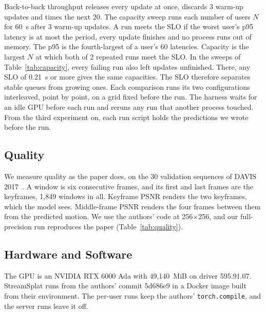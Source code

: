 Back-to-back throughput releases every update at once, discards 3 warm-up updates and times the next 20. %
The capacity sweep runs each number of users $N$ for 60~s after 3 warm-up updates. %
A run meets the SLO if the worst user's p95 latency is at most the period, every update finishes and no process runs out of memory. %
The p95 is the fourth-largest of a user's 60 latencies.
Capacity is the largest $N$ at which both of 2 repeated runs meet the SLO. %
In the sweeps of Table~\ref{tab:capacity}, every failing run also left updates unfinished. %
There, any SLO of 0.21~s or more gives the same capacities. %
The SLO therefore separates stable queues from growing ones.
Each comparison runs its two configurations interleaved, point by point, on a grid fixed before the run. %
The harness waits for an idle GPU before each run and reruns any run that another process touched. %
From the third experiment on, each run script holds the predictions we wrote before the run.

\subsection{Quality}

We measure quality as the paper does, on the 30 validation sequences of DAVIS 2017~\cite{davis2017}. %
A window is six consecutive frames, and its first and last frames are the keyframes, 1,849 windows in all. %
Keyframe PSNR renders the two keyframes, which the model sees.
Middle-frame PSNR renders the four frames between them from the predicted motion. %
We use the authors' code at 256$\times$256, and our full-precision run reproduces the paper (Table~\ref{tab:quality}). %

\subsection{Hardware and Software}

The GPU is an NVIDIA RTX 6000 Ada with 49,140~MiB on driver 595.91.07. %
StreamSplat runs from the authors' commit 5d686e9 in a Docker image built from their environment. %
The per-user runs keep the authors' \texttt{torch.compile}, and the server runs leave it off. %
